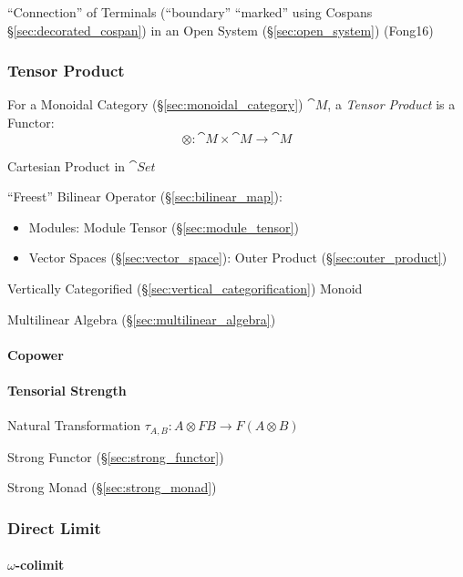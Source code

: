 \fist ``Connection'' of Terminals (``boundary'' ``marked'' using
Cospans \S\ref{sec:decorated_cospan}) in an Open System
(\S\ref{sec:open_system}) (Fong16)



\subsubsection{Tensor Product}\label{sec:tensor_product}

For a Monoidal Category (\S\ref{sec:monoidal_category}) $\cat{M}$,
a \emph{Tensor Product} is a Functor:
\[
  \otimes : \cat{M} \times \cat{M} \rightarrow \cat{M}
\]

Cartesian Product in $\cat{Set}$

``Freest'' Bilinear Operator (\S\ref{sec:bilinear_map}):
\begin{itemize}
\item Modules: Module Tensor (\S\ref{sec:module_tensor})
\item Vector Spaces (\S\ref{sec:vector_space}): Outer Product
  (\S\ref{sec:outer_product})
\end{itemize}

Vertically Categorified (\S\ref{sec:vertical_categorification}) Monoid

Multilinear Algebra (\S\ref{sec:multilinear_algebra})



\paragraph{Copower}\label{sec:copower}\hfill

\paragraph{Tensorial Strength}\label{sec:tensorial_strength}\hfill

Natural Transformation $\tau_{A,B} : A \otimes F B \rightarrow F (A
\otimes B)$

Strong Functor (\S\ref{sec:strong_functor})

Strong Monad (\S\ref{sec:strong_monad})



\subsubsection{Direct Limit}\label{sec:direct_limit}

\paragraph{$\omega$-colimit}\label{sec:omega_colimit}\hfill

